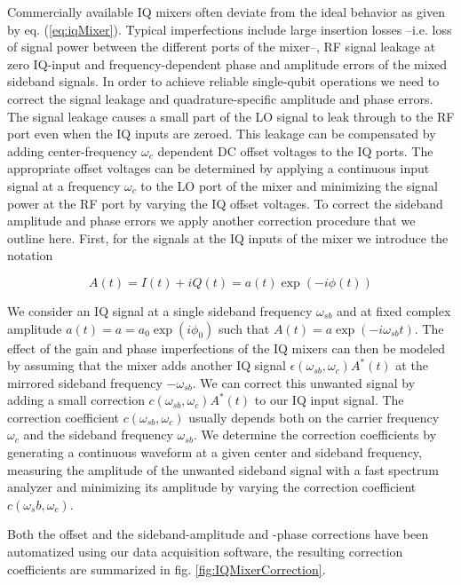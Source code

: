 Commercially available IQ mixers often deviate from the ideal behavior as given by eq. (\ref{eq:iqMixer}). Typical imperfections include large insertion losses --i.e. loss of signal power between the different ports of the mixer--, RF signal leakage at zero IQ-input and frequency-dependent phase and amplitude errors of the mixed sideband signals. In order to achieve reliable single-qubit operations we need to correct the signal leakage and quadrature-specific amplitude and phase errors. The signal leakage causes a small part of the LO signal to leak through to the RF port even when the IQ inputs are zeroed. This leakage can be compensated by adding center-frequency $\omega_c$ dependent DC offset voltages to the IQ ports. The appropriate offset voltages can be determined by applying a continuous input signal at a frequency $\omega_c$ to the LO port of the mixer and minimizing the signal power at the RF port by varying the IQ offset voltages. To correct the sideband amplitude and phase errors we apply another correction procedure that we outline here. First, for the signals at the IQ inputs of the mixer we introduce the notation

\begin{equation}
A(t) = I(t)+iQ(t) = a(t)\exp{(-i\phi(t))}
\end{equation}

We consider an IQ signal at a single sideband frequency $\omega_{sb}$ and at fixed complex amplitude $a(t) = a = a_0\exp{(i\phi_0)}$ such that $A(t) = a\exp{(-i \omega_{sb} t)}$. The effect of the gain and phase imperfections of the IQ mixers can then be modeled by assuming that the mixer adds another IQ signal $\epsilon(\omega_{sb},\omega_c)A^*(t)$ at the mirrored sideband frequency $-\omega_{sb}$. We can correct this unwanted signal by adding a small correction $c(\omega_{sb},\omega_c)A^*(t)$ to our IQ input signal. The correction coefficient $c(\omega_{sb},\omega_c)$ usually depends both on the carrier frequency $\omega_c$ and the sideband frequency $\omega_{sb}$. We determine the correction coefficients by generating a continuous waveform at a given center and sideband frequency, measuring the amplitude of the unwanted sideband signal with a fast spectrum analyzer and minimizing its amplitude by varying the correction coefficient $c(\omega_sb,\omega_c)$.

Both the offset and the sideband-amplitude and -phase corrections have been automatized using our data acquisition software, the resulting correction coefficients are summarized in fig. \ref{fig:IQMixerCorrection}.	

